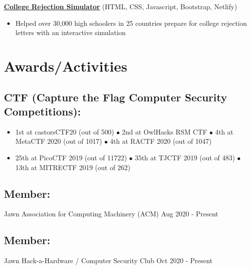 \documentclass{article}
\begin{document}
\textbf{\href{https://youtu.be/dQw4w9WgXcQ}{\underline{College Rejection Simulator}}} \hfill (HTML, CSS, Javascript, Bootstrap, Netlify)
\begin{itemize}
    \item Helped over 30,000 high schoolers in 25 countries prepare for college rejection letters with an interactive simulation
\end{itemize}

\section{Awards/Activities}
\subsection{CTF (Capture the Flag Computer Security Competitions):}
\begin{itemize}
    \item 1st at castorsCTF20 (out of 500) $\bullet$ 2nd at OwlHacks RSM CTF $\bullet$ 4th at MetaCTF 2020 (out of 1017) $\bullet$ 4th at RACTF 2020 (out of 1047)
    \item 25th at PicoCTF 2019 (out of 11722) $\bullet$ 35th at TJCTF 2019 (out of 483) $\bullet$ 13th at MITRECTF 2019 (out of 262)
\end{itemize} 
\subsection{Member: } Jawn Association for Computing Machinery (ACM) \hfill Aug 2020 - Present
\subsection{Member: } Jawn Hack-a-Hardware / Computer Security Club  \hfill Oct 2020 - Present
\end{document}
